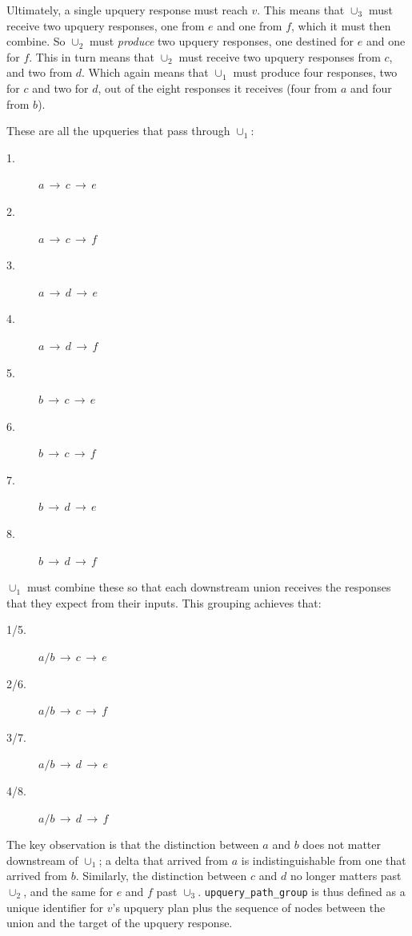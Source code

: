 Ultimately, a single upquery response must reach $v$. This means that $\cup_3$
must receive two upquery responses, one from $e$ and one from $f$, which it must
then combine. So $\cup_2$ must \emph{produce} two upquery responses, one
destined for $e$ and one for $f$. This in turn means that $\cup_2$ must receive
two upquery responses from $c$, and two from $d$. Which again means that
$\cup_1$ must produce four responses, two for $c$ and two for $d$, out of the
eight responses it receives (four from $a$ and four from $b$).

These are all the upqueries that pass through $\cup_1$:
        
\begin{multicols}{4}
\begin{description}
  \item [1.] $a\,\to\,c\,\to\,e$
  \item [2.] $a\,\to\,c\,\to\,f$
  \item [3.] $a\,\to\,d\,\to\,e$
  \item [4.] $a\,\to\,d\,\to\,f$
  \item [5.] $b\,\to\,c\,\to\,e$
  \item [6.] $b\,\to\,c\,\to\,f$
  \item [7.] $b\,\to\,d\,\to\,e$
  \item [8.] $b\,\to\,d\,\to\,f$
\end{description}
\end{multicols}

$\cup_1$ must combine these so that each downstream union receives the responses
that they expect from their inputs. This grouping achieves that:

\begin{multicols}{2}
\begin{description}
  \item [1/5.] $a/b\,\to\,c\,\to\,e$
  \item [2/6.] $a/b\,\to\,c\,\to\,f$
  \item [3/7.] $a/b\,\to\,d\,\to\,e$
  \item [4/8.] $a/b\,\to\,d\,\to\,f$
\end{description}
\end{multicols}

The key observation is that the distinction between $a$ and $b$ does not matter
downstream of $\cup_1$; a delta that arrived from $a$ is indistinguishable from
one that arrived from $b$. Similarly, the distinction between $c$ and $d$ no
longer matters past $\cup_2$, and the same for $e$ and $f$ past $\cup_3$.
\texttt{upquery\_path\_group} is thus defined as a unique identifier for $v$'s
upquery plan plus the sequence of nodes between the union and the target of the
upquery response.

